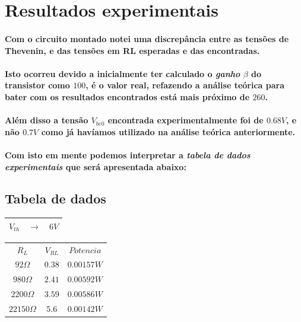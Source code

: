 \documentclass[12pt,twoside, a4paper, twocolumn]{article}
\begin{document}
\section{Resultados experimentais}

\paragraph*{Com o circuito montado notei uma discrepância entre as tensões de Thevenin, e das tensões em RL esperadas e das encontradas.}

\paragraph*{Isto ocorreu devido a inicialmente ter calculado o \emph{ganho} $\beta$ do transistor como $100$, é o valor real, refazendo a análise teórica para bater com os resultados encontrados está mais próximo de $260$.}

\paragraph*{Além disso a tensão $V_{be0}$ encontrada experimentalmente foi de $0.68V$, e não $0.7V$ como já havíamos utilizado na análise teórica anteriormente.}

\paragraph*{Com isto em mente podemos interpretar a \emph{tabela de dados experimentais} que será apresentada abaixo:}

\subsection{Tabela de dados}

\begin{center}
    \begin{tabular}{ |ccc| }
        \hline
        $V_{th}$ & $\rightarrow$ & $6V$ \\
        \hline
    \end{tabular}
\end{center}

\begin{center}
    \begin{tabular}{ |c|c|c| }
        \hline
        $R_L$            & $V_{RL}$ & $Potencia$ \\
        $92\varOmega$    & $0.38$   & $0.00157W$ \\
        $980\varOmega$   & $2.41$   & $0.00592W$ \\
        $2200\varOmega$  & $3.59$   & $0.00586W$ \\
        $22150\varOmega$ & $5.6$    & $0.00142W$ \\
        \hline
    \end{tabular}
\end{center}
\end{document}

